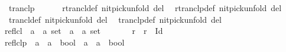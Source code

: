 \begin{isabellebody}
\ \ tranclp\ \ {\isacharparenleft}{\kern0pt}{\isachardoublequoteopen}{\isacharparenleft}{\kern0pt}{\isacharunderscore}{\kern0pt}\isactrlsup {\isacharplus}{\kern0pt}\isactrlsup {\isacharplus}{\kern0pt}{\isacharparenright}{\kern0pt}{\isachardoublequoteclose}\ {\isacharbrackleft}{\kern0pt}{}{}{}{}{\isacharbrackright}{\kern0pt}\ {}{}{}{}{\isacharparenright}{\kern0pt}\isanewline
\isanewline
{}\isamarkupfalse%
\isanewline
\ \ rtrancl{\isacharunderscore}{\kern0pt}def\ {\isacharbrackleft}{\kern0pt}nitpick{\isacharunderscore}{\kern0pt}unfold\ del{\isacharbrackright}{\kern0pt}\isanewline
\ \ rtranclp{\isacharunderscore}{\kern0pt}def\ {\isacharbrackleft}{\kern0pt}nitpick{\isacharunderscore}{\kern0pt}unfold\ del{\isacharbrackright}{\kern0pt}\isanewline
\ \ trancl{\isacharunderscore}{\kern0pt}def\ {\isacharbrackleft}{\kern0pt}nitpick{\isacharunderscore}{\kern0pt}unfold\ del{\isacharbrackright}{\kern0pt}\isanewline
\ \ tranclp{\isacharunderscore}{\kern0pt}def\ {\isacharbrackleft}{\kern0pt}nitpick{\isacharunderscore}{\kern0pt}unfold\ del{\isacharbrackright}{\kern0pt}\isanewline
\isanewline
{}\isamarkupfalse%
\isanewline
\isanewline
{}\isamarkupfalse%
\ reflcl\ {\isacharcolon}{\kern0pt}{\isacharcolon}{\kern0pt}\ {\isachardoublequoteopen}{\isacharparenleft}{\kern0pt}{\isacharprime}{\kern0pt}a\ {\isasymtimes}\ {\isacharprime}{\kern0pt}a{\isacharparenright}{\kern0pt}\ set\ {\isasymRightarrow}\ {\isacharparenleft}{\kern0pt}{\isacharprime}{\kern0pt}a\ {\isasymtimes}\ {\isacharprime}{\kern0pt}a{\isacharparenright}{\kern0pt}\ set{\isachardoublequoteclose}\ \ {\isacharparenleft}{\kern0pt}{\isachardoublequoteopen}{\isacharparenleft}{\kern0pt}{\isacharunderscore}{\kern0pt}\isactrlsup {\isacharequal}{\kern0pt}{\isacharparenright}{\kern0pt}{\isachardoublequoteclose}\ {\isacharbrackleft}{\kern0pt}{}{}{}{}{\isacharbrackright}{\kern0pt}\ {}{}{}{\isacharparenright}{\kern0pt}\isanewline
\ \ \ {\isachardoublequoteopen}r\isactrlsup {\isacharequal}{\kern0pt}\ {\isasymequiv}\ r\ {\isasymunion}\ Id{\isachardoublequoteclose}\isanewline
\isanewline
{}\isamarkupfalse%
\ reflclp\ {\isacharcolon}{\kern0pt}{\isacharcolon}{\kern0pt}\ {\isachardoublequoteopen}{\isacharparenleft}{\kern0pt}{\isacharprime}{\kern0pt}a\ {\isasymRightarrow}\ {\isacharprime}{\kern0pt}a\ {\isasymRightarrow}\ bool{\isacharparenright}{\kern0pt}\ {\isasymRightarrow}\ {\isacharprime}{\kern0pt}a\ {\isasymRightarrow}\ {\isacharprime}{\kern0pt}a\ {\isasymRightarrow}\ bool{\isachardoublequoteclose}\ \ {\isacharparenleft}{\kern0pt}{\isachardoublequoteopen}{\isacharparenleft}{\kern0pt}{\isacharunderscore}{\kern0pt}\isactrlsup {\isacharequal}{\kern0pt}\isactrlsup {\isacharequal}{\kern0pt}{\isacharparenright}{\kern0pt}{\isachardoublequoteclose}\ {\isacharbrackleft}{\kern0pt}{}{}{}{}{\isacharbrackright}{\kern0pt}\ {}{}{}{}{\isacharparenright}{\kern0pt}\isanewline

\end{isabellebody}
